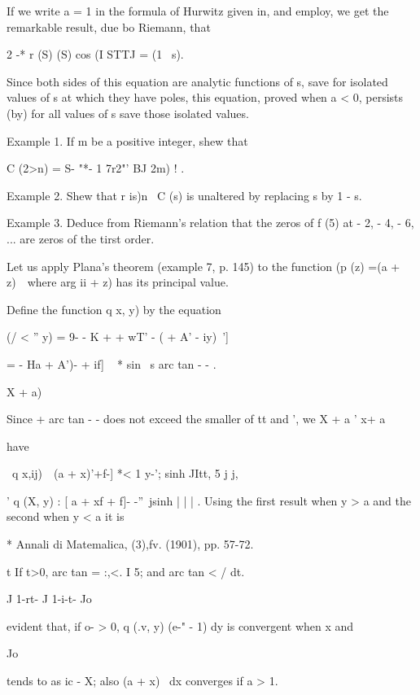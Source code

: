 If we write a = 1 in the formula of Hurwitz given in, and
employ, we get the remarkable result, due bo Riemann, that

2 -* r (S) (S) cos (I STTJ = (1 \ s).

Since both sides of this equation are analytic functions of s, save
for isolated values of s at which they have poles, this equation,
proved when a < 0, persists (by) for all values of s save those
isolated values.

Example 1. If m be a positive integer, shew that

C (2>n) = S- "*- 1 7r2"' BJ 2m) ! .

Example 2. Shew that r is)n~ C (s) is unaltered by replacing s by 1 -
s.


Example 3. Deduce from Riemann's relation that the zeros of f (5) at -
2, - 4, - 6, ... are zeros of the tirst order.


Let us apply Plana's theorem (example 7, p. 145) to the function (p
(z) =(a + z)~\ where arg ii + z) has its principal value.

Define the function q x, y) by the equation

(/ < '' y) = 9- - K + + wT' - ( + A' - iy)~']

= - Ha + A')- + if] ~ * sin \ s arc tan - - .

  X + a)

Since + arc tan - - does not exceed the smaller of tt and ', we X + a
' x+ a

have

\ q x,ij)\ \ (a + x)'+f-] *< 1 y-'; sinh JItt, 5 j j,

' q (X, y) : [ a + xf + f]- -''\ jsinh | | | . Using the first result
when y > a and the second when y < a it is

* Annali di Matemalica, (3),fv. (1901), pp. 57-72.

t If t>0, arc tan = :,<. I 5; and arc tan < / dt.

J 1-rt- J 1-i-t- Jo

%
%

evident that, if o- > 0, q (.v, y) (e-" - 1) dy is convergent when x
and

Jo

tends to as ic - X; also (a + x)~ dx converges if a > 1.

